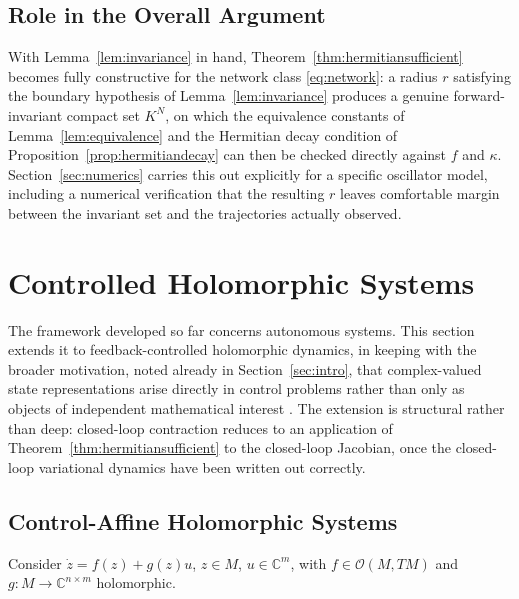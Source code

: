 \documentclass[preprint,12pt,authoryear]{elsarticle}
\begin{document}
\subsection{Role in the Overall Argument}

With Lemma~\ref{lem:invariance} in hand, Theorem~\ref{thm:hermitiansufficient} becomes fully constructive for the network class \eqref{eq:network}: a radius $r$ satisfying the boundary hypothesis of Lemma~\ref{lem:invariance} produces a genuine forward-invariant compact set $K^N$, on which the equivalence constants of Lemma~\ref{lem:equivalence} and the Hermitian decay condition of Proposition~\ref{prop:hermitiandecay} can then be checked directly against $f$ and $\kappa$. Section~\ref{sec:numerics} carries this out explicitly for a specific oscillator model, including a numerical verification that the resulting $r$ leaves comfortable margin between the invariant set and the trajectories actually observed.

%
%
%

\section{Controlled Holomorphic Systems}
\label{sec:control}

The framework developed so far concerns autonomous systems. This section extends it to feedback-controlled holomorphic dynamics, in keeping with the broader motivation, noted already in Section~\ref{sec:intro}, that complex-valued state representations arise directly in control problems rather than only as objects of independent mathematical interest \cite{mirrahimi2007stabilizing,doriacerezo2026symmetrisation}. The extension is structural rather than deep: closed-loop contraction reduces to an application of Theorem~\ref{thm:hermitiansufficient} to the closed-loop Jacobian, once the closed-loop variational dynamics have been written out correctly.

\subsection{Control-Affine Holomorphic Systems}

Consider $\dot z=f(z)+g(z)u$, $z\in M$, $u\in\mathbb{C}^m$, with $f\in\mathcal{O}(M,TM)$ and $g:M\to\mathbb{C}^{n\times m}$ holomorphic.
\end{document}
